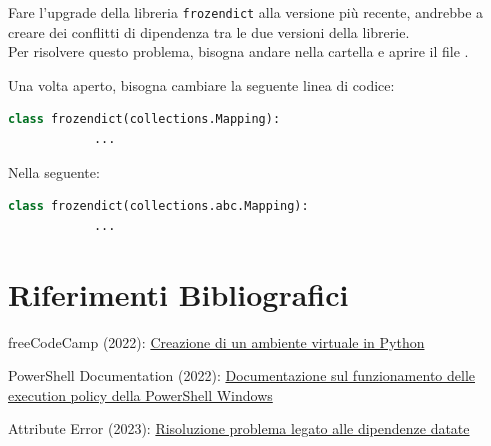 \documentclass[12pt, letterpaper]{article}
\begin{document}
\noindent Fare l'upgrade della libreria \texttt{frozendict} alla versione più recente, andrebbe a
creare dei conflitti di dipendenza tra le due versioni della librerie. \\

\noindent Per risolvere questo problema, bisogna andare nella cartella
 e aprire il file .

\noindent Una volta aperto, bisogna cambiare la seguente linea di codice: \\

\begin{lstlisting}[language=Python]
      class frozendict(collections.Mapping):
            ...
\end{lstlisting}

Nella seguente:

\begin{lstlisting}[language=Python]
      class frozendict(collections.abc.Mapping):
            ...
\end{lstlisting}


\section{Riferimenti Bibliografici}

\begin{thebibliography}{100}
      freeCodeCamp (2022):  \href{https://www.freecodecamp.org/news/how-to-setup-virtual-environments-in-python/}{
            Creazione di un ambiente virtuale in Python
      }

      PowerShell Documentation (2022):
      \href{https://learn.microsoft.com/en-gb/powershell/module/microsoft.powershell.core/about/about_execution_policies?view=powershell-7.4}{
            Documentazione sul funzionamento delle execution policy della PowerShell Windows
      }

      Attribute Error (2023): \href{https://stackoverflow.com/questions/70749690/attributeerror-module-collections-has-no-attribute-mapping}{
            Risoluzione problema legato alle dipendenze datate
      }
\end{thebibliography}
\end{document}
